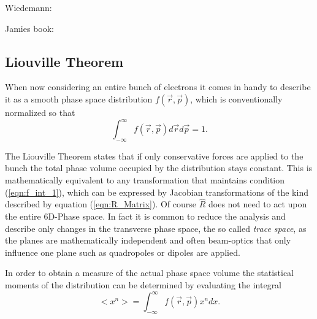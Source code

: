 Wiedemann:\cite{Wiedemann_accelerator}


 Jamies book: \cite{Book_Fundamentals_Rosenzweig}
\subsection{Liouville Theorem}
When now considering an entire bunch of electrons it comes in handy to describe it as a smooth phase space distribution
$f(\vec{r},\vec{p})$, which is conventionally normalized so that  
\begin{equation}
\label{eqn:f_int_1}
\int^{\infty}_{-\infty}f(\vec{r},\vec{p})d\vec{r}d\vec{p}=1 .
\end{equation}

The Liouville Theorem states that if only conservative forces are applied to the bunch the total phase volume occupied by the distribution stays constant. This is mathematically equivalent to any transformation that maintains condition (\ref{eqn:f_int_1}), which can be expressed by Jacobian transformations of the kind described by equation (\ref{eqn:R_Matrix}).
Of course $\hat{R}$ does not need to act upon the entire 6D-Phase space. In fact it is common to reduce the analysis and describe only changes in the transverse phase space, the so called \textit{trace space}, as the planes are mathematically independent and often beam-optics that only influence one plane such as quadropoles or dipoles are applied.

In order to obtain a measure of the actual phase space volume the statistical moments of the distribution can be determined by evaluating the integral 
\begin{equation}
<x^n>=\int_{-\infty}^{\infty}f(\vec{r},\vec{p})x^n dx.
\end{equation}
